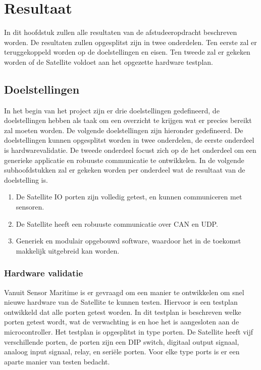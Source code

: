 \chapter{Resultaat}
In dit hoofdstuk zullen alle resultaten van de afstudeeropdracht beschreven worden. De resultaten zullen opgesplitst zijn in twee onderdelen. Ten eerste zal er teruggekoppeld worden op de doelstellingen en eisen. Ten tweede zal er gekeken worden of de Satellite voldoet aan het opgezette hardware testplan.

\section{Doelstellingen}
In het begin van het project zijn er drie doelstellingen gedefineerd, de doelstellingen hebben als taak om een overzicht te krijgen wat er precies bereikt zal moeten worden. De volgende doelstellingen zijn hieronder gedefineerd. De doelstellingen kunnen opgesplitst worden in twee onderdelen, de eerste onderdeel is hardwarevalidatie. De tweede onderdeel focust zich op de het onderdeel om een generieke applicatie en robuuste communicatie te ontwikkelen. In de volgende subhoofdstukken zal er gekeken worden per onderdeel wat de resultaat van de doelstelling is.
\begin{enumerate}
	\item De Satellite IO porten zijn volledig getest, en kunnen communiceren met sensoren.
	\item De Satellite heeft een robuuste communicatie over CAN en UDP.
	\item Generiek en modulair opgebouwd software, waardoor het in de toekomst makkelijk uitgebreid kan worden.
\end{enumerate}

\subsection{Hardware validatie}
Vanuit Sensor Maritime is er gevraagd om een manier te ontwikkelen om snel nieuwe hardware van de Satellite te kunnen testen. Hiervoor is een testplan ontwikkeld dat alle porten getest worden. In dit testplan is beschreven welke porten getest wordt, wat de verwachting is en hoe het is aangesloten aan de microcontroller. Het testplan is opgesplitst in type porten. De Satellite heeft vijf verschillende porten, de porten zijn een DIP switch, digitaal output signaal, analoog input signaal, relay, en seriële porten. Voor elke type ports is er een aparte manier van testen bedacht. \newline

